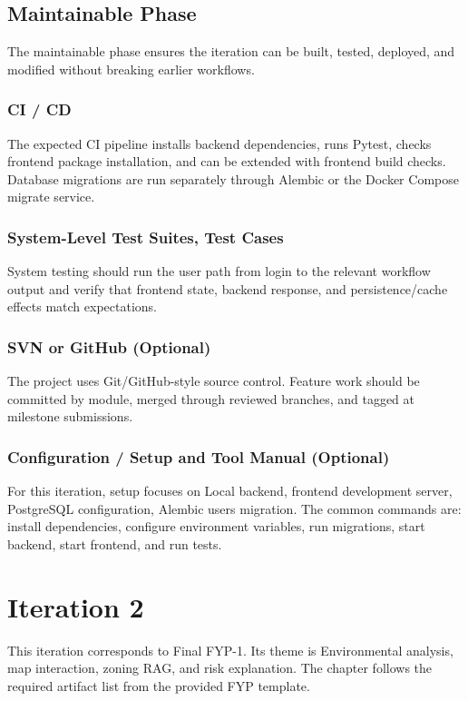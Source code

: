 \documentclass[12pt,a4paper,oneside]{report}
\begin{document}
\section{Maintainable Phase}
The maintainable phase ensures the iteration can be built, tested, deployed, and modified without breaking earlier workflows.

\subsection{CI / CD}
The expected CI pipeline installs backend dependencies, runs Pytest, checks frontend package installation, and can be extended with frontend build checks. Database migrations are run separately through Alembic or the Docker Compose migrate service.

\subsection{System-Level Test Suites, Test Cases}
System testing should run the user path from login to the relevant workflow output and verify that frontend state, backend response, and persistence/cache effects match expectations.

\subsection{SVN or GitHub (Optional)}
The project uses Git/GitHub-style source control. Feature work should be committed by module, merged through reviewed branches, and tagged at milestone submissions.

\subsection{Configuration / Setup and Tool Manual (Optional)}
For this iteration, setup focuses on Local backend, frontend development server, PostgreSQL configuration, Alembic users migration. The common commands are: install dependencies, configure environment variables, run migrations, start backend, start frontend, and run tests.

\chapter{Iteration 2}
This iteration corresponds to Final FYP-1. Its theme is Environmental analysis, map interaction, zoning RAG, and risk explanation. The chapter follows the required artifact list from the provided FYP template.
\end{document}
